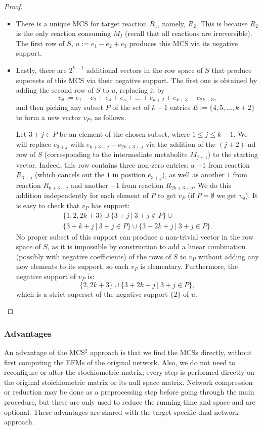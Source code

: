 \documentclass{bioinfo}
\theoremstyle{plain}
\theoremstyle{definition}
\begin{document}
\begin{proof}
\begin{itemize}
\item There is a unique MCS for target reaction $R_1$, namely, $R_2$. This is because $R_2$ is the only reaction consuming $M_I$ (recall that all reactions are irreversible). The first row of $S$, $u := e_1 - e_2 + e_3$ produces this MCS via its negative support.

\item Lastly, there are $2^{k-1}$ additional vectors in the row space of $S$ that produce supersets of this MCS via their negative support. The first one is obtained by adding the second row of $S$ to $u$, replacing it by 
\[
v_{\emptyset} := e_1 - e_2 + e_4 + e_5 + \dots + e_{k+2} + e_{k+3} - e_{2k+3},
\]
and then picking any subset $P$ of the set of $k - 1$ entries $E := \{4, 5, \dots, k + 2\}$ to form a new vector $v_P$, as follows.

Let $3 + j \in P$ be an element of the chosen subset, where $1 \leq j \leq k - 1$. We will replace $e_{3 + j}$ with $e_{k + 3 + j} - e_{2k + 3 + j}$ via the addition of the $(j + 2)$-nd row of $S$ (corresponding to the intermediate metabolite $M_{j+1}$) to the starting vector. Indeed, this row contains three non-zero entries: a $-1$ from reaction $R_{3 + j}$ (which cancels out the $1$ in position $e_{3 + j}$), as well as another $1$ from reaction $R_{k + 3 + j}$ and another $-1$ from reaction $R_{2k + 3 + j}$. We do this addition independently for each element of $P$ to get $v_P$ (if $P = \emptyset$ we get $v_{\emptyset}$). It is easy to check that $v_P$ has support:
\begin{align*}
\{1, 2, 2k + 3\} \cup \{3 + j ~|~ 3 + j \notin P \} \cup \\ \{ 3 + k + j ~|~ 3 + j \in P\} \cup \{ 3 + 2k + j ~|~ 3 + j \in P\}.
\end{align*}
No proper subset of this support can produce a non-trivial vector in the row space of $S$, as it is impossible by construction to add a linear combination (possibly with negative coefficients) of the rows of $S$ to $v_{P}$ without adding any new elements to its support, so each $v_P$ is elementary. Furthermore, the negative support of $v_P$ is:
\[
\{2, 2k+3\} \cup \{3 + 2k + j ~|~ 3 + j \in P\},
\]
which is a strict superset of the negative support $\{2\}$ of $u$.
\end{itemize}
\end{proof}


\subsubsection{Advantages}
An advantage of the MCS$^2$ approach is that we find the MCSs directly, without first computing the EFMs of the original network. Also,
we do not need to reconfigure or alter the stochiometric matrix; every step is performed directly on the original stoichiometric matrix or its null space matrix. Network compression or reduction may be done as a preprocessing step before going through the main procedure, but these are only used to reduce the running time and space and are optional. These advantages are shared with the target-specific dual network approach.
\end{document}
